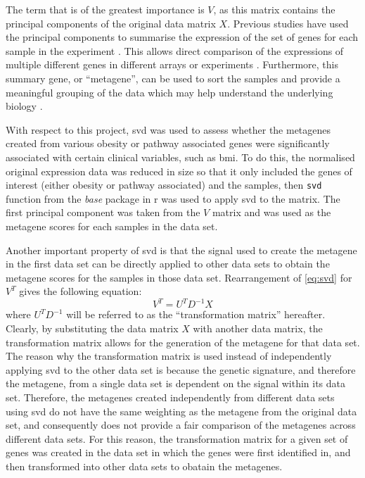 The term that is of the greatest importance is $V$, as this matrix contains the principal components of the original data matrix $X$.
Previous studies have used the principal components to summarise the expression of the set of genes for each sample in the experiment \citep{Alter2000,West2001}.
This allows direct comparison of the expressions of multiple different genes in different arrays or experiments \citep{Alter2000}.
Furthermore, this summary gene, or ``metagene'', can be used to sort the samples and provide a meaningful grouping of the data which may help understand the underlying biology \citep{Alter2000}.

With respect to this project, \gls{svd} was used to assess whether the metagenes created from various obesity or pathway associated genes were significantly associated with certain clinical variables, such as \gls{bmi}.
To do this, the normalised original expression data was reduced in size so that it only included the genes of interest (either obesity or pathway associated) and the samples, then \texttt{svd} function from the \textit{base} package in \gls{r} was used to apply \gls{svd} to the matrix.
The first principal component was taken from the $V$ matrix and was used as the metagene scores for each samples in the data set.

Another important property of \gls{svd} is that the signal used to create the metagene in the first data set can be directly applied to other data sets to obtain the metagene scores for the samples in those data set.
Rearrangement of \cref{eq:svd} for $V^T$ gives the following equation:
\begin{equation}
	\label{eq:transmat}
	V^T = U^{T}D^{-1}X
\end{equation}
where $U^{T}D^{-1}$ will be referred to as the ``transformation matrix'' hereafter.
Clearly, by substituting the data matrix $X$ with another data matrix, the transformation matrix allows for the generation of the metagene for that data set.
The reason why the transformation matrix is used instead of independently applying \gls{svd} to the other data set is because the genetic signature, and therefore the metagene, from a single data set is dependent on the signal within its data set.
Therefore, the metagenes created independently from different data sets using \gls{svd} do not have the same weighting as the metagene from the original data set, and consequently does not provide a fair comparison of the metagenes across different data sets.
For this reason, the transformation matrix for a given set of genes was created in the data set in which the genes were first identified in, and then transformed into other data sets to obatain the metagenes.

